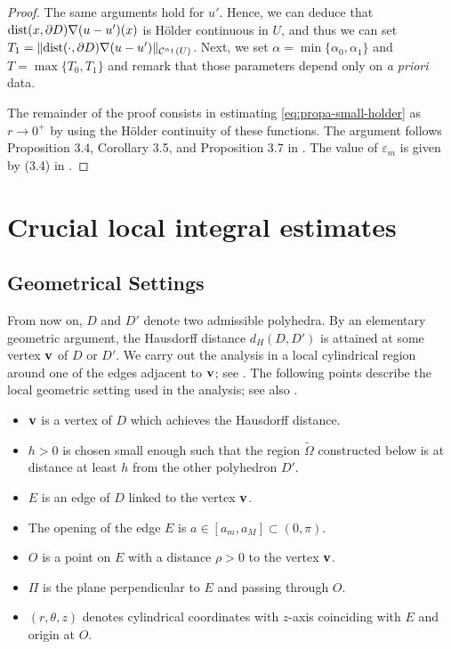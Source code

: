 ﻿\documentclass[11pt,reqno,oneside]{amsart}
\theoremstyle{definition}
\theoremstyle{remark}
\newcommand{\Cont}{\mathcal{C}}
\newcommand{\n}{\nabla}
\newcommand{\dist}{{\rm dist}}
\renewcommand{\a}{\alpha}
\newcommand{\e}{\varepsilon}
\renewcommand{\t}{\theta}
\newcommand{\p}{\partial}
\renewcommand{\O}{\Omega}
\begin{document}
\begin{proof}
        The same arguments hold for $u'$. Hence, we can deduce that $\dist(x,\p D)\n (u-u')(x)$ is H\"older continuous in $U$, and thus we can set $T_1=\|\dist(\cdot,\p D)\n (u-u')\|_{\Cont^{\a_1}(U)}$. Next, we set $\a=\min\{\a_0,\a_1\}$ and $T=\max\{T_0,T_1\}$ and remark that those parameters depend only on {\it a priori} data. 
        
        The remainder of the proof consists in estimating \eqref{eq:propa-small-holder} as $r\rightarrow0^+$ by using the H\"older continuity of these functions. The argument follows Proposition 3.4, Corollary 3.5, and Proposition 3.7 in \cite{moi5}. The value of $\e_m$ is given by (3.4) in \cite{moi5}.
    \end{proof}

    \section{Crucial local integral estimates}\label{sec:integral}

    \subsection{Geometrical Settings}

        From now on, $D$ and $D'$ denote two admissible polyhedra. By an elementary geometric argument, the Hausdorff distance $d_H(D,D')$ is attained at some vertex ${\bf v}$ of $D$ or $D'$. We carry out the analysis in a local cylindrical region around one of the edges adjacent to ${\bf v}$; see . The following points describe the local geometric setting used in the analysis; see also .
        \begin{itemize}
            \item ${\bf v}$ is a vertex of $D$ which achieves the Hausdorff distance.
            \item $h>0$ is chosen small enough such that the region $\widetilde{\O}$ constructed below is at distance at least $h$ from the other polyhedron $D'$.
            \item $E$ is an edge of $D$ linked to the vertex ${\bf v}$.
            \item The opening of the edge $E$ is $a\in [a_m,a_M] \subset (0,\pi)$.
            \item $O$ is a point on $E$ with a distance $\rho>0$ to the vertex ${\bf v}$.
            \item $\Pi$ is the plane perpendicular to $E$ and passing through $O$.
            \item $(r,\t,z)$ denotes cylindrical coordinates with $z$-axis coinciding with $E$ and origin at $O$.
        \end{itemize}
\end{document}

